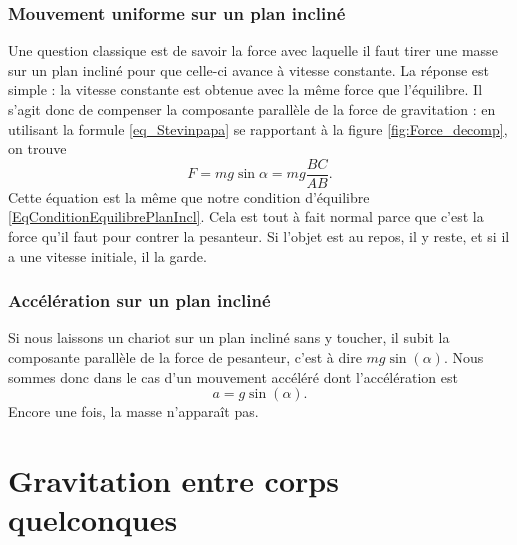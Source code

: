 \subsubsection{Mouvement uniforme sur un plan incliné}
\label{sss_inclineF}

Une question classique est de savoir la force avec laquelle il faut tirer une masse sur un plan incliné pour que celle-ci avance à vitesse constante. La réponse est simple : la vitesse constante est obtenue avec la même force que l'équilibre. Il s'agit donc de compenser la composante parallèle de la force de gravitation : en utilisant la formule \eqref{eq_Stevinpapa} se rapportant à la figure \ref{fig:Force_decomp}, on trouve
\begin{equation} \label{eq_expunF}
	F=mg\sin\alpha=mg\frac{ BC }{ AB }.
\end{equation}
Cette équation est la même que notre condition d'équilibre \eqref{EqConditionEquilibrePlanIncl}. Cela est tout à fait normal parce que c'est la force qu'il faut pour contrer la pesanteur. Si l'objet est au repos, il y reste, et si il a une vitesse initiale, il la garde.

\subsubsection{Accélération sur un plan incliné}

Si nous laissons un chariot sur un plan incliné sans y toucher, il subit la composante parallèle de la force de pesanteur, c'est à dire $mg\sin(\alpha)$. Nous sommes donc dans le cas d'un mouvement accéléré dont l'accélération est
\begin{equation}
	a=g\sin(\alpha).
\end{equation}
Encore une fois, la masse n'apparaît pas.

\section{Gravitation entre corps quelconques}

